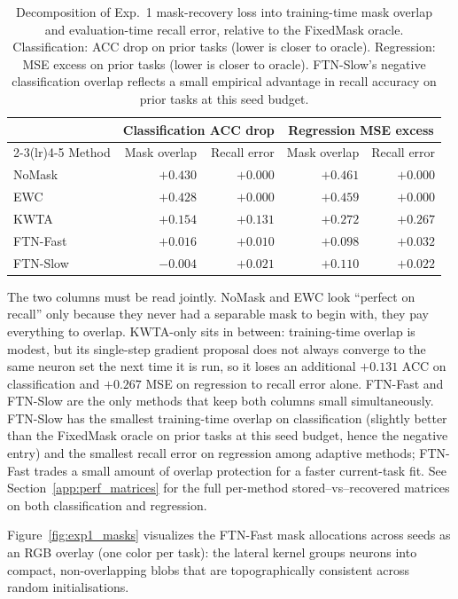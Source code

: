 \documentclass{article}
\begin{document}
\begin{table}[h]
\centering
\caption{Decomposition of Exp.\ 1 mask-recovery loss into training-time mask overlap and evaluation-time recall error, relative to the FixedMask oracle. Classification: ACC drop on prior tasks (lower is closer to oracle). Regression: MSE excess on prior tasks (lower is closer to oracle). FTN-Slow's negative classification overlap reflects a small empirical advantage in recall accuracy on prior tasks at this seed budget.}
\label{tab:overlap_recall}
\small
\begin{tabular}{l rr rr}
\toprule
 & \multicolumn{2}{c}{Classification ACC drop} & \multicolumn{2}{c}{Regression MSE excess} \\
\cmidrule(lr){2-3}\cmidrule(lr){4-5}
Method & Mask overlap & Recall error & Mask overlap & Recall error \\
\midrule
NoMask    & $+0.430$ & $+0.000$ & $+0.461$ & $+0.000$ \\
EWC       & $+0.428$ & $+0.000$ & $+0.459$ & $+0.000$ \\
KWTA      & $+0.154$ & $+0.131$ & $+0.272$ & $+0.267$ \\
FTN-Fast  & $+0.016$ & $+0.010$ & $+0.098$ & $+0.032$ \\
FTN-Slow  & $-0.004$ & $+0.021$ & $+0.110$ & $+0.022$ \\
\bottomrule
\end{tabular}
\end{table}

The two columns must be read jointly. NoMask and EWC look ``perfect on recall'' only because they never had a separable mask to begin with, they pay everything to overlap. KWTA-only sits in between: training-time overlap is modest, but its single-step gradient proposal does not always converge to the same neuron set the next time it is run, so it loses an additional $+0.131$ ACC on classification and $+0.267$ MSE on regression to recall error alone. FTN-Fast and FTN-Slow are the only methods that keep both columns small simultaneously. FTN-Slow has the smallest training-time overlap on classification (slightly better than the FixedMask oracle on prior tasks at this seed budget, hence the negative entry) and the smallest recall error on regression among adaptive methods; FTN-Fast trades a small amount of overlap protection for a faster current-task fit. See Section~\ref{app:perf_matrices} for the full per-method stored--vs--recovered matrices on both classification and regression.

Figure~\ref{fig:exp1_masks} visualizes the FTN-Fast mask allocations across seeds as an RGB overlay (one color per task): the lateral kernel groups neurons into compact, non-overlapping blobs that are topographically consistent across random initialisations.
\end{document}
